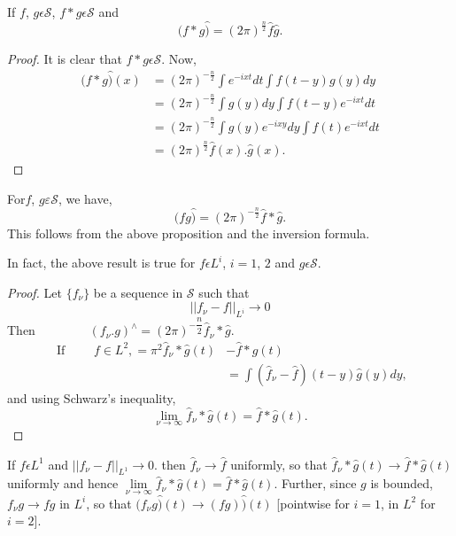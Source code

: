 \begin{proposition}\label{chap3:sec4:prop3}%
  If $f$, $g \epsilon \mathscr{S}$, $f * g \epsilon \mathscr{S}$ and 
  $$
  (f * g \hat {)} = (2 \pi )^\frac{n}{2} \hat{f} \hat{g}.
  $$
\end{proposition}

\begin{proof}
  It is clear that $f * g \epsilon \mathscr{S}$. Now,
  \begin{align*}
    (f * g \hat{)} (x )  & = \left(2 \pi \right)^{-\frac{n}{2}} \int e^{- ixt }
    dt \int f (t - y ) g (y ) dy \\ 
    & = \left(2 \pi \right)^{-\frac{n}{2}} \int g (y )  dy \int f (t - y ) e^{-
      ixt }  dt \\ 
    & = \left(2 \pi \right)^{-\frac{n}{2}} \int  g (y) e^{- ixy } dy \int f (t
    )  e^{- ixt } dt \\ 
    & = \left(2 \pi \right)^{\frac{n}{2}} \hat{f } (x). \hat{g} (x).
  \end{align*}
\end{proof}

\begin{coro*}%
  For\pageoriginale $f$, $g \varepsilon  \mathscr{S}$, we have, 
  $$
  (fg \hat{)} = (2 \pi)^{- \frac{n}{2}} \hat{f} * \hat{g}.
  $$
  This follows from the above proposition and the inversion formula.
\end{coro*}

\begin{remark*}%
  In fact, the above result is true  for $f  \epsilon L^i$, $i =
  1$, $2$ and $g \epsilon \mathscr{S}$. 
\end{remark*}

\begin{proof}
  Let $\{ f_{\nu} \}$  be a sequence in $\mathscr{S}$ such that 
  $$
  ||  f_{\nu} -  f||_{L^i} \to 0
  $$
  Then $ \qquad \qquad( f_{\nu} . g)^{\wedge} = (2 \pi)^{ -
    \dfrac{n}{2}} \hat{f}_{\nu} * \hat{g}$. 
  \begin{align*}
    \text{ If } \qquad f \in L^2, = \pi^2 \hat{f}_{\nu} * \hat{g} (t)
    & - \hat{f} * \hat{g} (t) \\ 
    &=  \int (\hat{f}_{\nu} - \hat{f}) (t-y) \hat{g} (y) dy,
  \end{align*}
  and using Schwarz's inequality,
  $$
  \lim _{\nu \to \infty} \hat{f}_{\nu} * \hat{g}(t) = \hat{f} * \hat{g} (t).
  $$
\end{proof}

If $f \epsilon L^1$ and $|| f_{\nu} - f||_{L^1} \to 0$. then $
\hat{f}_{\nu} \to \hat{f}$ uniformly, so that $\hat{f}_{\nu} * \hat{g}
(t) \to \hat{f} * \hat{g}(t)$ uniformly and hence $\lim\limits_{\nu
  \to \infty} \hat{f}_{\nu} * \hat{g} (t) = \hat{f} * \hat{g} (t)$.
Further, since $g$ is bounded, $f_{\nu} g \to f g$ in $L^i$, so that
$(f_{\nu} g \hat{)} (t) \to (f g) \hat{)}(t)$ [pointwise for $i = 1$,
  in $L^2$ for $i =2$]. 

